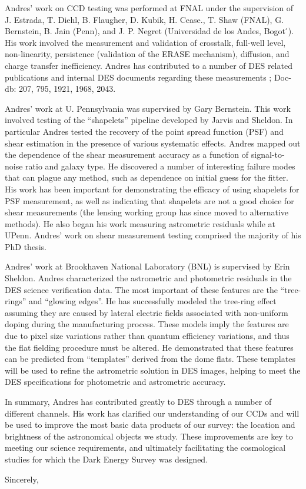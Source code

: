 \documentclass[12pt]{letter}
\begin{document}
\begin{letter}{}
Andres' work on CCD testing was performed at FNAL under the supervision of J.
Estrada, T. Diehl, B. Flaugher, D. Kubik, H. Cease., T. Shaw (FNAL), G.
Bernstein, B. Jain (Penn), and J. P. Negret (Universidad de los Andes, Bogot ́).
His work involved the measurement and validation of crosstalk, full-well level,
non-linearity, persistence (validation of the ERASE mechanism), diffusion, and
charge transfer inefficiency.  Andres has contributed to a number of DES
related publications and internal DES documents regarding these measurements
\cite{Diehl2008,Flaugher2010,Flaugher2012}; Doc-db: 207, 795, 1921, 1968, 2043.

Andres' work at U. Pennsylvania was supervised by Gary Bernstein.  This work
involved testing of the ``shapelets'' pipeline developed by Jarvis and Sheldon.
In particular Andres tested the recovery of the point spread function (PSF) and
shear estimation in the presence of various systematic effects.  Andres mapped
out the dependence of the shear measurement accuracy as a function of
signal-to-noise ratio and galaxy type.  He discovered a number of interesting
failure modes that can plague any method, such as dependence on initial guess
for the fitter. His work has been important for demonstrating the efficacy of
using shapelets for PSF measurement, as well as indicating that shapelets are
not a good choice for shear measurements (the lensing working group has since
moved to alternative methods).  He also began his work measuring astrometric
residuals while at UPenn.  Andres' work on shear measurement testing
comprised the majority of his PhD thesis.

Andres' work at Brookhaven National Laboratory (BNL) is supervised by Erin
Sheldon.  Andres characterized the astrometric and photometric residuals in the
DES science verification data. The most important of these features are the
``tree-rings'' and ``glowing edges''. He has successfully modeled the tree-ring
effect assuming they are caused by lateral electric fields associated with
non-uniform doping during the manufacturing
process\cite{PlazasProceedings2014,Plazas2014}.  These models imply the
features are due to pixel size variations rather than quantum efficiency
variations, and thus the flat fielding procedure must be altered.  He
demonstrated that these features can be predicted from ``templates'' derived
from the dome flats.  These templates will be used to refine the astrometric
solution in DES images, helping to meet the DES specifications for photometric
and astrometric accuracy.

In summary, Andres has contributed greatly to DES through a number of different
channels.  His work has clarified our understanding of our CCDs and will be
used to improve the most basic data products of our survey:  the location and
brightness of the astronomical objects we study.  These improvements are key to
meeting our science requirements, and ultimately facilitating the cosmological studies
for which the Dark Energy Survey was designed.

\closing{Sincerely, }






\end{letter}
\end{document}
